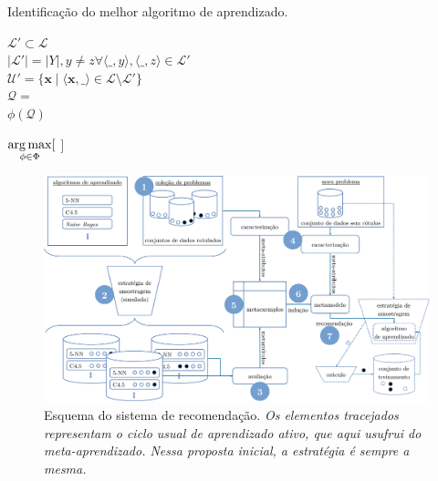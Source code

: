 \begin{algoritmo}
\caption{Identificação do melhor algoritmo de aprendizado.}
\label{algbest}
  \small
{}
 {
  $\mathcal{L}' \subset \mathcal{L}$  \\
  $|\mathcal{L}'|=|Y|, y\neq z \forall \langle \_,y\rangle,\langle \_,z\rangle \in \mathcal{L}'$ \\
  $\mathcal{U}' = \{\bm{x} \mid \langle \bm{x}, \_ \rangle \in \mathcal{L} \setminus \mathcal{L}' \}$ \\
  $\mathcal{Q} = $  \\
  \Return $\phi(\mathcal{Q})$
}

 {
  \Return $\operatorname*{arg\,max}\limits_{\phi\in\Phi}[$  $]$\\  
}  
\end{algoritmo}

\begin{landscape}
\begin{figure}
\centering
    \includegraphics[scale=0.57]{images/meta.pdf}
	\caption[Esquema do sistema de recomendação.]{Esquema do sistema de recomendação. \textit{Os elementos tracejados representam o ciclo usual de aprendizado ativo, que aqui usufrui do meta-aprendizado. Nessa proposta inicial, a estratégia é sempre a mesma.}}
	\label{esquema}
\end{figure}
\end{landscape}

